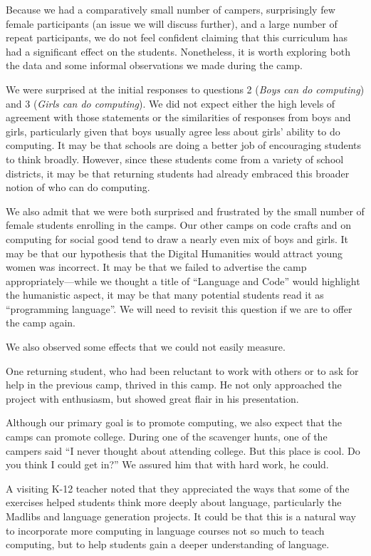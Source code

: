 Because we had a comparatively small number of campers, surprisingly
few female participants (an issue we will discuss further), and a
large number of repeat participants, we do not feel confident
claiming that this curriculum has had a significant effect on the
students.  Nonetheless, it is worth exploring both the data and
some informal observations we made during the camp.

We were surprised at the initial responses to questions 2 (\textit{Boys
can do computing}) and 3 (\textit{Girls can do computing}).  We did
not expect either the high levels of agreement with those statements
or the similarities of responses from boys and girls, particularly
given that boys usually agree less about girls' ability to do
computing.  It may be that schools are doing a better job of
encouraging students to think broadly.  However, since these students
come from a variety of school districts, it may be that returning
students had already embraced this broader notion of who can do
computing.

We also admit that we were both surprised and frustrated by the
small number of female students enrolling in the camps.  Our other
camps on code crafts and on computing for social good tend to draw
a nearly even mix of boys and girls.  It may be that our hypothesis
that the Digital Humanities would attract young women was incorrect.
It may be that we failed to advertise the camp appropriately---while
we thought a title of ``Language and Code'' would highlight the
humanistic aspect, it may be that many potential students read it
as ``programming language''.  We will need to revisit this question
if we are to offer the camp again.

We also observed some effects that we could not easily measure.

One returning student, who had been reluctant to work with others
or to ask for help in the previous camp, thrived in this camp.  He not
only approached the project with enthusiasm, but showed great
flair in his presentation.

Although our primary goal is to promote computing, we also expect
that the camps can promote college.  During one of the scavenger
hunts, one of the campers said ``I never thought about attending
college.  But this place is cool.  Do you think I could get in?''
We assured him that with hard work, he could.

A visiting K-12 teacher noted that they appreciated the ways that
some of the exercises helped students think more deeply about
language, particularly the Madlibs and language generation projects.
It could be that this is a natural way to incorporate more computing
in language courses not so much to teach computing, but to help
students gain a deeper understanding of language.

